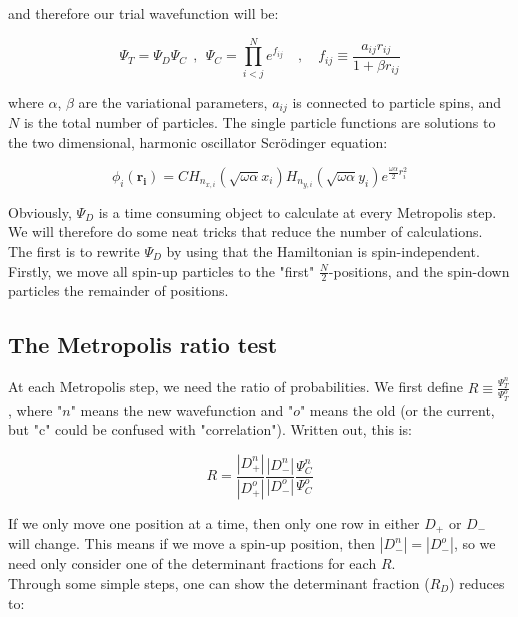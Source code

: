 \documentclass[english, a4paper]{article}
\newcommand{\bm}[1]{\mathbf{#1}}
\begin{document}
	and therefore our trial wavefunction will be:
	
	\begin{equation}
	\Psi_T = \Psi_{D}\Psi_{C} \:\:,\:\: \Psi_{C} = \prod_{i<j}^N e^{f_{ij}}\quad,\quad f_{ij} \equiv\frac{a_{ij}r_{ij}}{1+\beta r_{ij}} \label{ManyBodyWavefunction}
	\end{equation}
	
	where $\alpha$, $\beta$ are the variational parameters, $a_{ij}$ is connected to particle spins, and $N$ is the total number of particles. The single particle functions are solutions to the two dimensional, harmonic oscillator Scr\"odinger equation:
	
	\begin{equation}
	\phi_i(\bm{r_i}) = C H_{n_{x,i}}(\sqrt{\omega \alpha}x_i)H_{n_{y,i}}(\sqrt{\omega \alpha}y_i)e^{\frac{\omega\alpha}{2}r_i^2}
	\end{equation}
	
	Obviously, $\Psi_{D}$ is a time consuming object to calculate at every Metropolis step. We will therefore do some neat tricks that reduce the number of calculations.\\
	The first is to rewrite $\Psi_D$ by using that the Hamiltonian is spin-independent. Firstly, we move all spin-up particles to the "first" $\frac{N}{2}$-positions, and the spin-down particles the remainder of positions. \\
	
	\subsection{The Metropolis ratio test}
	At each Metropolis step, we need the ratio of probabilities. We first define $R\equiv\frac{\Psi_T^n}{\Psi_T^o}$, where "$n$" means the new wavefunction and "$o$" means the old (or the current, but "c" could be confused with "correlation"). Written out, this is:
	
	\begin{equation}
	R = \frac{|D_+^n|}{|D_+^o|}\frac{|D_-^n|}{|D_-^o|}\frac{\Psi_C^n}{\Psi_C^o}
	\end{equation}
	
	If we only move one position at a time, then only one row in either $D_+$ or $D_-$ will change. This means if we move a spin-up position, then $|D_-^n| = |D_-^o|$, so we need only consider one of the determinant fractions for each $R$.\\
	Through some simple steps, one can show the determinant fraction ($R_{D}$) reduces to:
	
\end{document}

